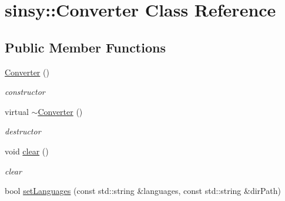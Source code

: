 \hypertarget{classsinsy_1_1Converter}{\section{sinsy\-:\-:\-Converter \-Class \-Reference}
\label{classsinsy_1_1Converter}
}
\subsection*{\-Public \-Member \-Functions}
\begin{DoxyCompactItemize}
\item 
\hypertarget{classsinsy_1_1Converter_a1de81f3e06093411e5d27ce882bc010f}{\hyperlink{classsinsy_1_1Converter_a1de81f3e06093411e5d27ce882bc010f}{\-Converter} ()}\label{classsinsy_1_1Converter_a1de81f3e06093411e5d27ce882bc010f}

\begin{DoxyCompactList}\small\item\em constructor \end{DoxyCompactList}\item 
\hypertarget{classsinsy_1_1Converter_a9ecd05695a52c03158b81e544e13b996}{virtual \hyperlink{classsinsy_1_1Converter_a9ecd05695a52c03158b81e544e13b996}{$\sim$\-Converter} ()}\label{classsinsy_1_1Converter_a9ecd05695a52c03158b81e544e13b996}

\begin{DoxyCompactList}\small\item\em destructor \end{DoxyCompactList}\item 
\hypertarget{classsinsy_1_1Converter_a7b2caf7931deed5f5ff1be9e04225743}{void \hyperlink{classsinsy_1_1Converter_a7b2caf7931deed5f5ff1be9e04225743}{clear} ()}\label{classsinsy_1_1Converter_a7b2caf7931deed5f5ff1be9e04225743}

\begin{DoxyCompactList}\small\item\em clear \end{DoxyCompactList}\item 
\hypertarget{classsinsy_1_1Converter_a5ab31f8f1e79953f60d2c48485ed4ee5}{bool \hyperlink{classsinsy_1_1Converter_a5ab31f8f1e79953f60d2c48485ed4ee5}{set\-Languages} (const std\-::string \&languages, const std\-::string \&dir\-Path)}\label{classsinsy_1_1Converter_a5ab31f8f1e79953f60d2c48485ed4ee5}


\end{DoxyCompactItemize}
